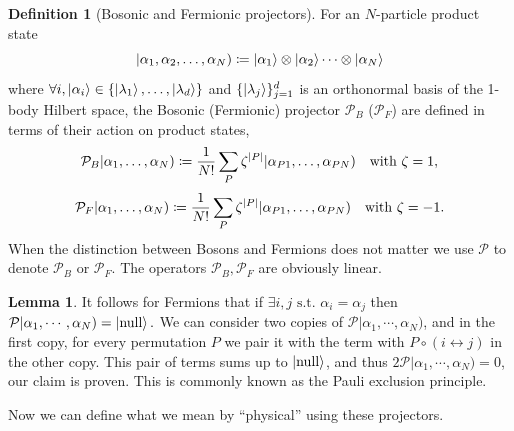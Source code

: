 \documentclass{article}
\theoremstyle{definition}
\newtheorem{dfn}[mot]{Definition}
\newtheorem{lem}[mot]{Lemma}
\numberwithin{equation}{section}
\begin{document}
\begin{dfn}[Bosonic and Fermionic projectors]
    For an $N$-particle product state 
    \begin{equation}
        |\alpha_1, \alpha_2, \ldots ,\alpha_{N})
    \coloneqq \ket{\alpha_1} \otimes \ket{\alpha_2}\cdots \otimes \ket{\alpha_{N}}
    \end{equation}
    where $\forall i, \ket{\alpha_{i}} \in 
    \{\ket{\lambda_1}, \ldots ,\ket{\lambda_{d}}\}$ 
    and $\{\ket{\lambda_{j}}\}_{j=1}^{d}$ is an orthonormal basis 
    of the 1-body Hilbert space, 
    the Bosonic (Fermionic) projector $\mathcal{P}_{B}$ ($\mathcal{P}_{F}$) 
    are defined in terms of their action on product states,  
    \begin{equation}
        \mathcal{P}_{B}|\alpha_1, \ldots ,\alpha_{N})
        \coloneqq
        \frac{1}{N!} \sum_{P}\zeta^{\abs{P}} 
        |\alpha_{P1}, \ldots ,\alpha_{PN})
        \quad \text{with } \zeta = 1,
    \end{equation}
    \begin{equation}
        \mathcal{P}_{F}|\alpha_1, \ldots ,\alpha_{N})
        \coloneqq
        \frac{1}{N!} \sum_{P}\zeta^{\abs{P}} 
        |\alpha_{P1}, \ldots ,\alpha_{PN})
        \quad \text{with } \zeta = -1.
    \end{equation}
    When the distinction between Bosons and Fermions does not matter 
    we use $\mathcal{P}$ to denote $\mathcal{P}_{B}$ or $\mathcal{P}_{F}$. 
    The operators $\mathcal{P}_{B}, \mathcal{P}_{F}$ 
    are obviously linear.
\end{dfn}

\begin{lem}
It follows for Fermions that if $ \exists i,j \text{ s.t. } \alpha_{i}=\alpha_{j}$ then
$\mathcal{P} |\alpha_{1},\cdots,\alpha_{N})=\ket{\text{null}}.$
We can consider two copies of $\mathcal{P} |\alpha_{1},\cdots,\alpha_{N})$,
and in the first copy,
for every permutation $P$ we pair it with
the term with
$P \circ (i \leftrightarrow j)$
in the other copy.
This pair of terms sums up to $\ket{\text{null}}$,
and thus $2 \mathcal{P} |\alpha_{1},\cdots,\alpha_{N}) = 0$,
our claim is proven.
This is commonly known as the Pauli exclusion principle.
\end{lem}

Now we can define what we mean by ``physical'' using 
these projectors. 
\end{document}
